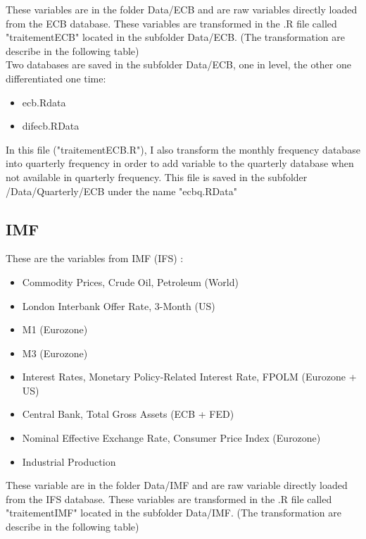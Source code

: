 \documentclass[11pt,a4paper]{article}
\begin{document}
These variables are in the folder Data/ECB and are raw variables directly loaded from the ECB database. These variables are transformed in the .R file called "traitementECB" located in the subfolder Data/ECB. (The transformation are describe in the following table) \\

Two databases are saved in the subfolder Data/ECB, one in level, the other one differentiated one time: 

\begin{itemize}
\item ecb.Rdata 
\item difecb.RData 
\end{itemize}

\vspace{0.5cm}

In this file ("traitementECB.R"), I also transform the monthly frequency database into quarterly  frequency in order to add variable to the quarterly database when not available in quarterly frequency. This file is saved in the subfolder /Data/Quarterly/ECB under the name "ecbq.RData" 






\subsection{IMF}

These are the variables from IMF (IFS) :
\begin{itemize}
\item Commodity Prices, Crude Oil, Petroleum (World)
\item London Interbank Offer Rate, 3-Month (US)
\item M1 (Eurozone)
\item M3 (Eurozone)
\item Interest Rates, Monetary Policy-Related Interest Rate, FPOLM (Eurozone + US)
\item Central Bank, Total Gross Assets (ECB + FED)
\item Nominal Effective Exchange Rate, Consumer Price Index (Eurozone)
\item Industrial Production
\end{itemize}

\vspace{0.5cm}

These variable are in the folder Data/IMF and are raw variable directly loaded from the IFS database. These variables are transformed in the .R file called "traitementIMF" located in the subfolder Data/IMF. (The transformation are describe in the following table) \\
\end{document}
